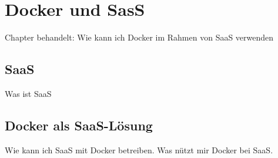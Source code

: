 \chapter{Docker und SasS}
\label{cha:docker_und_saas}
Chapter behandelt: Wie kann ich Docker im Rahmen von SaaS verwenden
\section{SaaS}
\label{sec:saas}
Was ist SaaS
\section{Docker als SaaS-Lösung}
\label{sec:docker_als_saasLösung}
Wie kann ich SaaS mit Docker betreiben. Was nützt mir Docker bei SaaS.